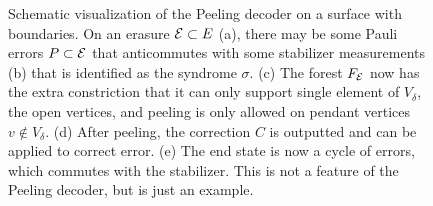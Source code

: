 \begin{figure}
    \caption{Schematic visualization of the Peeling decoder on a surface with boundaries. On an erasure $\mathcal{E}\subset E$ (a), there may be some Pauli errors $P\subset \mathcal{E}$ that anticommutes with some stabilizer measurements (b) that is identified as the syndrome $\sigma$. (c) The forest $F_{\mathcal{E}}$ now has the extra constriction that it can only support single element of $V_\delta$, the open vertices, and peeling is only allowed on pendant vertices $v\notin V_\delta$. (d) After peeling, the correction $C$ is outputted and can be applied to correct error. (e) The end state is now a cycle of errors, which commutes with the stabilizer. This is not a feature of the Peeling decoder, but is just an example.}
  \end{figure}